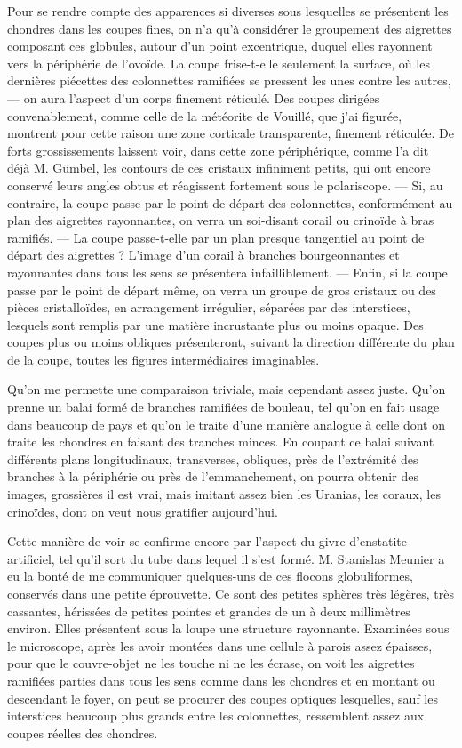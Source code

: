 \documentclass[a4paper, 12pt, oneside, french]{book}
\begin{document}
Pour se rendre compte des apparences si diverses sous lesquelles se présentent les chondres dans les coupes fines, on n'a qu'à considérer le groupement des aigrettes composant ces globules, autour d'un point excentrique, duquel elles rayonnent vers la périphérie de l'ovoïde. La coupe frise-t-elle seulement la surface, où les dernières piécettes des colonnettes ramifiées se pressent les unes contre les autres, --- on aura l'aspect d'un corps finement réticulé. Des coupes dirigées convenablement, comme celle de la météorite de Vouillé, que j'ai figurée, montrent pour cette raison une zone corticale transparente, finement réticulée. De forts grossissements laissent voir, dans cette zone périphérique, comme l'a dit déjà M. Gümbel, les contours de ces cristaux infiniment petits, qui ont encore conservé leurs angles obtus et réagissent fortement sous le polariscope. --- Si, au contraire, la coupe passe par le point de départ des colonnettes, conformément au plan des aigrettes rayonnantes, on verra un soi-disant corail ou crinoïde à bras ramifiés. --- La coupe passe-t-elle par un plan presque tangentiel au point de départ des aigrettes ? L'image d'un corail à branches bourgeonnantes et rayonnantes dans tous les sens se présentera infailliblement. --- Enfin, si la coupe passe par le point de départ même, on verra un groupe de gros cristaux ou des pièces cristalloïdes, en arrangement irrégulier, séparées par des interstices, lesquels sont remplis par une matière incrustante plus ou moins opaque. Des coupes plus ou moins obliques présenteront, suivant la direction différente du plan de la coupe, toutes les figures intermédiaires imaginables.

Qu'on me permette une comparaison triviale, mais cependant assez juste. Qu'on prenne un balai formé de branches ramifiées de bouleau, tel qu'on en fait usage dans beaucoup de pays et qu'on le traite d'une manière analogue à celle dont on traite les chondres en faisant des tranches minces. En coupant ce balai suivant différents plans longitudinaux, transverses, obliques, près de l'extrémité des branches à la périphérie ou près de l'emmanchement, on pourra obtenir des images, grossières il est vrai, mais imitant assez bien les Uranias, les coraux, les crinoïdes, dont on veut nous gratifier aujourd'hui.

Cette manière de voir se confirme encore par l'aspect du givre d'enstatite artificiel, tel qu'il sort du tube dans lequel il s'est formé. M. Stanislas Meunier a eu la bonté de me communiquer quelques-uns de ces flocons globuliformes, conservés dans une petite éprouvette. Ce sont des petites sphères très légères, très cassantes, hérissées de petites pointes et grandes de un à deux millimètres environ. Elles présentent sous la loupe une structure rayonnante. Examinées sous le microscope, après les avoir montées dans une cellule à parois assez épaisses, pour que le couvre-objet ne les touche ni ne les écrase, on voit les aigrettes ramifiées parties dans tous les sens comme dans les chondres et en montant ou descendant le foyer, on peut se procurer des coupes optiques lesquelles, sauf les interstices beaucoup plus grands entre les colonnettes, ressemblent assez aux coupes réelles des chondres.
\end{document}
